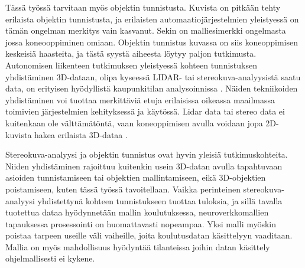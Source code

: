 Tässä työssä tarvitaan myös objektin tunnistusta.
Kuvista on pitkään tehty erilaista objektin tunnistusta, ja erilaisten automaatiojärjestelmien yleistyessä on tämän ongelman merkitys vain kasvanut. 
Sekin on malliesimerkki ongelmasta jossa koneooppiminen omiaan.
Objektin tunnistus kuvassa on siis koneoppimisen keskeisiä haasteita, ja tästä syystä aiheesta löytyy paljon tutkimusta.
Autonomisen liikenteen tutkimuksen yleistyessä kohteen tunnistuksen yhdistäminen 3D-dataan, olipa kyseessä LIDAR- tai stereokuva-analyysistä saatu data, on erityisen hyödyllistä kaupunkitilan analysoinnissa \cite{MengZeYu2024TODf}. Näiden tekniikoiden yhdistäminen voi tuottaa merkittäviä etuja erilaisissa oikeassa maailmassa toimivien järjestelmien kehityksessä ja käytössä.
Lidar data tai stereo data ei kuitenkaan ole välttämätöntä, vaan koneoppimisen avulla voidaan jopa 2D-kuvista hakea erilaista 3D-dataa \cite{MaXinzhu20243ODF}.


Stereokuva-analyysi ja objektin tunnistus ovat hyvin yleisiä tutkimuskohteita.
Niiden yhdistäminen rajoittuu kuitenkin usein 3D-datan avulla tapahtuvaan asioiden tunnistamiseen tai objektien mallintamiseen, eikä 3D-objektien poistamiseen, kuten tässä työssä tavoitellaan.
Vaikka perinteinen stereokuva-analyysi yhdistettynä kohteen tunnistukseen tuottaa tuloksia, ja sillä tavalla tuotettua dataa hyödynnetään mallin koulutuksessa, neuroverkkomallien tapauksessa prosessointi on huomattavasti nopeampaa.
Yksi malli myöskin poistaa tarpeen useille väli vaiheille, joita koulutusdatan käsittelyyn vaaditaan.
Mallia on myös mahdollisuus hyödyntää tilanteissa joihin datan käsittely ohjelmallisesti ei kykene.
